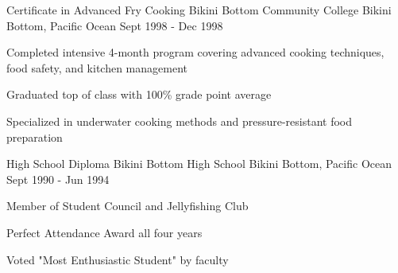 \begin{cventries}

  \cventry
    {Certificate in Advanced Fry Cooking} %
    {Bikini Bottom Community College} %
    {Bikini Bottom, Pacific Ocean} %
    {Sept 1998 - Dec 1998} %
    {
      \begin{cvitems}
        \item {Completed intensive 4-month program covering advanced cooking techniques, food safety, and kitchen management}
        \item {Graduated top of class with 100\% grade point average}
        \item {Specialized in underwater cooking methods and pressure-resistant food preparation}
      \end{cvitems}
    }

  \cventry
    {High School Diploma} %
    {Bikini Bottom High School} %
    {Bikini Bottom, Pacific Ocean} %
    {Sept 1990 - Jun 1994} %
    {
      \begin{cvitems}
        \item {Member of Student Council and Jellyfishing Club}
        \item {Perfect Attendance Award all four years}
        \item {Voted "Most Enthusiastic Student" by faculty}
      \end{cvitems}
    }

\end{cventries}
